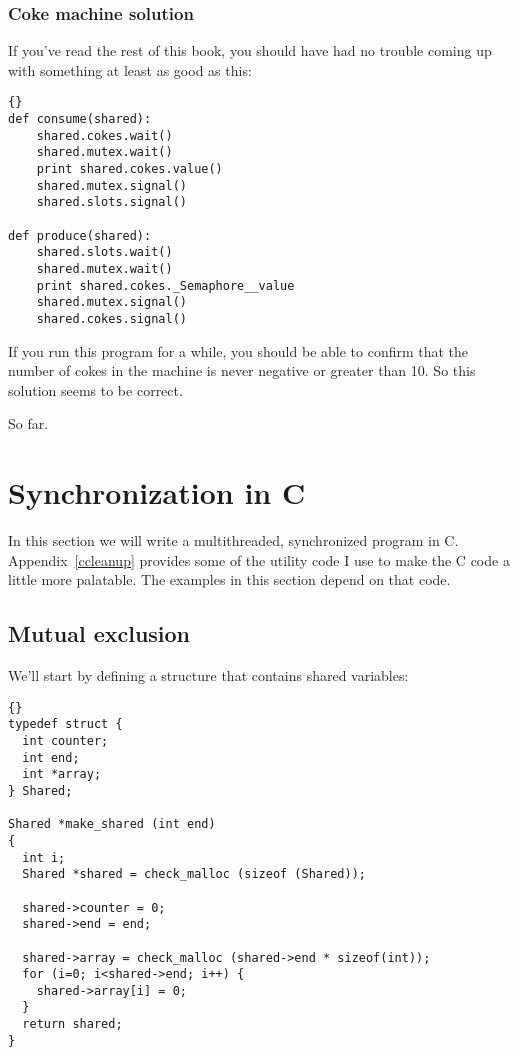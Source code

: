 \documentclass{book}
\newcommand{\clearemptydoublepage}{\newpage\cleardoublepage}
\begin{document}
\clearemptydoublepage
\subsection {Coke machine solution}

If you've read the rest of this book, you should have had no
trouble coming up with something at least as good as this:

\begin{lstlisting}[title={}]{}
def consume(shared):
    shared.cokes.wait()
    shared.mutex.wait()
    print shared.cokes.value()
    shared.mutex.signal()
    shared.slots.signal()

def produce(shared):
    shared.slots.wait()
    shared.mutex.wait()
    print shared.cokes._Semaphore__value
    shared.mutex.signal()
    shared.cokes.signal()
\end{lstlisting}

If you run this program for a while, you should be able to confirm
that the number of cokes in the machine is never negative or greater
than 10.  So this solution seems to be correct.

So far.


\chapter{Synchronization in C}
\label{csync}

In this section we will write a multithreaded, synchronized
program in C.  Appendix~\ref{ccleanup} provides some of the utility
code I use to make the C code a little more palatable.  The
examples in this section depend on that code.

\section{Mutual exclusion}

We'll start by defining a structure that contains shared
variables:

\begin{lstlisting}[title={}]{}
typedef struct {
  int counter;
  int end;
  int *array;
} Shared;

Shared *make_shared (int end)
{
  int i;
  Shared *shared = check_malloc (sizeof (Shared));

  shared->counter = 0;
  shared->end = end;

  shared->array = check_malloc (shared->end * sizeof(int));
  for (i=0; i<shared->end; i++) {
    shared->array[i] = 0;
  }
  return shared;
}
\end{lstlisting}
\end{document}

